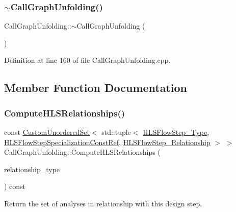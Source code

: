 \subsubsection{\texorpdfstring{$\sim$\+Call\+Graph\+Unfolding()}{~CallGraphUnfolding()}}
{\footnotesize\ttfamily Call\+Graph\+Unfolding\+::$\sim$\+Call\+Graph\+Unfolding (\begin{DoxyParamCaption}{ }\end{DoxyParamCaption})\hspace{0.3cm}{\ttfamily [virtual]}}



Definition at line 160 of file Call\+Graph\+Unfolding.\+cpp.



\subsection{Member Function Documentation}
\mbox{\label{classCallGraphUnfolding_af8507af00670b0bd8b00b56d20c829f1}} 
\subsubsection{\texorpdfstring{Compute\+H\+L\+S\+Relationships()}{ComputeHLSRelationships()}}
{\footnotesize\ttfamily const \hyperlink{classCustomUnorderedSet}{Custom\+Unordered\+Set}$<$ std\+::tuple$<$ \hyperlink{hls__step_8hpp_ada16bc22905016180e26fc7e39537f8d}{H\+L\+S\+Flow\+Step\+\_\+\+Type}, \hyperlink{hls__step_8hpp_a5fdd2edf290c196531d21d68e13f0e74}{H\+L\+S\+Flow\+Step\+Specialization\+Const\+Ref}, \hyperlink{hls__step_8hpp_a3ad360b9b11e6bf0683d5562a0ceb169}{H\+L\+S\+Flow\+Step\+\_\+\+Relationship} $>$ $>$ Call\+Graph\+Unfolding\+::\+Compute\+H\+L\+S\+Relationships (\begin{DoxyParamCaption}\item[{const \hyperlink{classDesignFlowStep_a723a3baf19ff2ceb77bc13e099d0b1b7}{Design\+Flow\+Step\+::\+Relationship\+Type}}]{relationship\+\_\+type }\end{DoxyParamCaption}) const\hspace{0.3cm}{\ttfamily [virtual]}}



Return the set of analyses in relationship with this design step. 


